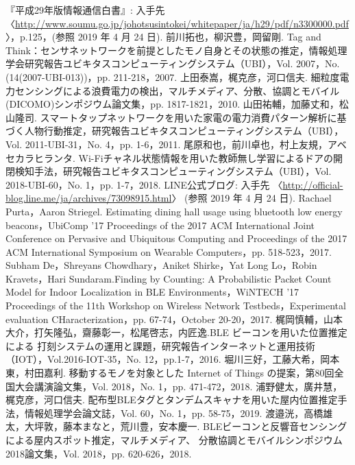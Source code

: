 \documentclass[Japanese]{dicomopapers}
\begin{document}
\begin{thebibliography}{20}
    『平成29年版情報通信白書』: 入手先 〈\url{http://www.soumu.go.jp/johotsusintokei/whitepaper/ja/h29/pdf/n3300000.pdf}〉，p.125，(参照 2019 年 4 月 24 日).
    前川拓也，柳沢豊，岡留剛. Tag and Think：センサネットワークを前提としたモノ自身とその状態の推定，情報処理学会研究報告ユビキタスコンピューティングシステム（UBI），Vol. 2007，No. (14(2007-UBI-013))，pp. 211-218，2007.
    上田泰嵩，梶克彦，河口信夫. 細粒度電力センシングによる浪費電力の検出，マルチメディア、分散、協調とモバイル(DICOMO)シンポジウム論文集，pp. 1817-1821，2010.
    山田祐輔，加藤丈和，松山隆司. スマートタップネットワークを用いた家電の電力消費パターン解析に基づく人物行動推定，研究報告ユビキタスコンピューティングシステム（UBI），Vol. 2011-UBI-31，No. 4，pp. 1-6，2011.
    尾原和也，前川卓也，村上友規，アベセカラヒランタ. Wi-Fiチャネル状態情報を用いた教師無し学習によるドアの開閉検知手法，研究報告ユビキタスコンピューティングシステム（UBI），Vol. 2018-UBI-60，No. 1，pp. 1-7，2018.
    LINE公式ブログ: 入手先 〈\url{http://official-blog.line.me/ja/archives/73098915.html}〉 (参照 2019 年 4 月 24 日).
    Rachael Purta，Aaron Striegel. Estimating dining hall usage using bluetooth low energy beacons，UbiComp '17 Proceedings of the 2017 ACM International Joint Conference on Pervasive and Ubiquitous Computing and Proceedings of the 2017 ACM International Symposium on Wearable Computers，pp. 518-523，2017.
     Subham De，Shreyans Chowdhary，Aniket Shirke，Yat Long Lo，Robin Kravets，Hari Sundaram.Finding by Counting: A Probabilistic Packet Count Model for Indoor Localization in BLE Environments，WiNTECH '17 Proceedings of the 11th Workshop on Wireless Network Testbeds，Experimental evaluation CHaracterization，pp. 67-74，October 20-20，2017.
    梶岡慎輔，山本大介，打矢隆弘，齋藤彰一，松尾啓志，内匠逸.BLE ビーコンを用いた位置推定による 打刻システムの運用と課題，研究報告インターネットと運用技術（IOT），Vol.2016-IOT-35，No. 12，pp.1-7，2016.
    堀川三好，工藤大希，岡本東，村田嘉利. 移動するモノを対象とした Internet of Things の提案，第80回全国大会講演論文集，Vol. 2018，No. 1，pp. 471-472，2018.
    浦野健太，廣井慧，梶克彦，河口信夫. 配布型BLEタグとタンデムスキャナを用いた屋内位置推定手法，情報処理学会論文誌，Vol. 60，No. 1，pp. 58-75，2019.
    渡邉洸，高橋雄太，大坪敦，藤本まなと，荒川豊，安本慶一. BLEビーコンと反響音センシングによる屋内スポット推定，マルチメディア、 分散協調とモバイルシンポジウム2018論文集，Vol. 2018，pp. 620-626，2018.

\end{thebibliography}
\end{document}
